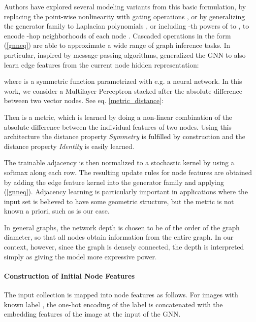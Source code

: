 \documentclass{article} \usepackage{iclr2018_conference,times}
\begin{document}
Authors have explored several modeling variants from this basic formulation, by replacing the point-wise nonlinearity 
with gating operations \cite{duvenaud2015convolutional}, or by generalizing the generator family to 
Laplacian polynomials \cite{defferrard2016convolutional, kipf2016semi, bruna2013spectral}, 
or including -th powers of  to ,  to
 encode -hop neighborhoods of each node \cite{bruna2017community}.
Cascaded operations in the form (\ref{gnneq}) are able to approximate 
a wide range of graph inference tasks. In particular, inspired by message-passing algorithms, 
 \cite{kearnes2016molecular,gilmer2017neural} generalized the GNN to also learn edge features  from the 
current node hidden representation:

where  is a symmetric function parametrized with e.g. a neural network. 
In this work, we consider a Multilayer Perceptron stacked after the absolute difference between two vector nodes. See eq. \ref{metric_distance}:


Then  is a metric, which is learned by doing a non-linear combination of the absolute difference between the individual features of two nodes. Using this architecture the distance property \textit{Symmetry}   is fulfilled by construction and the distance property \textit{Identity}   is easily learned.

The trainable adjacency is then normalized to a stochastic kernel by using a softmax along each row. 
The resulting update rules for node features are obtained by adding the edge feature kernel  
into the generator family  and applying (\ref{gnneq}).
Adjacency learning is particularly important in applications where 
the input set is believed to have some geometric structure, but the metric 
is not known a priori, such as is our case.

In general graphs, the network depth is chosen to be of the order of the graph diameter, so that all nodes obtain information from the entire graph. In our context, however, since the graph is densely connected, the depth is interpreted simply as giving the model more expressive power.

\paragraph{Construction of Initial Node Features}

The input collection  is mapped into node features as follows. 
For images  with known label , the one-hot encoding of the label is concatenated with the embedding features of the image at the input of the GNN.
\end{document}
